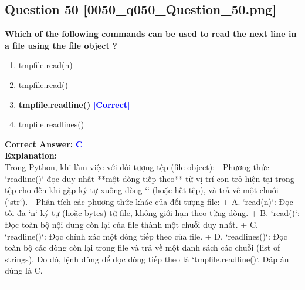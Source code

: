 \documentclass[11pt,a4paper]{article}
\begin{document}
\begin{minipage}{\textwidth}
\subsection*{Question 50 \quad \footnotesize{[0050_q050_Question_50.png]}}
\noindent \textbf{Which of the following commands can be used to read the next line in a file using the file object ?}

\begin{enumerate}[label=\Alph*.]
    \item tmpfile.read(n)
    \item tmpfile.read()
    \item \textbf{tmpfile.readline()} \hfill \textcolor{blue}{\textbf{[Correct]}}
    \item tmpfile.readlines()
\end{enumerate}

\noindent \textbf{Correct Answer:} \textcolor{blue}{\textbf{C}} \\[4pt]
\noindent \textbf{Explanation:}\\
Trong Python, khi làm việc với đối tượng tệp (file object):\newline
- Phương thức `readline()` đọc duy nhất **một dòng tiếp theo** từ vị trí con trỏ hiện tại trong tệp cho đến khi gặp ký tự xuống dòng `\n` (hoặc hết tệp), và trả về một chuỗi (`str`).\newline
- Phân tích các phương thức khác của đối tượng file:\newline
  + A. `read(n)`: Đọc tối đa `n` ký tự (hoặc bytes) từ file, không giới hạn theo từng dòng.\newline
  + B. `read()`: Đọc toàn bộ nội dung còn lại của file thành một chuỗi duy nhất.\newline
  + C. `readline()`: Đọc chính xác một dòng tiếp theo của file.\newline
  + D. `readlines()`: Đọc toàn bộ các dòng còn lại trong file và trả về một danh sách các chuỗi (list of strings).\newline
Do đó, lệnh dùng để đọc dòng tiếp theo là `tmpfile.readline()`. Đáp án đúng là C.
\end{minipage}
\vspace{0.8cm}
\hrule
\vspace{0.5cm}
\end{document}
